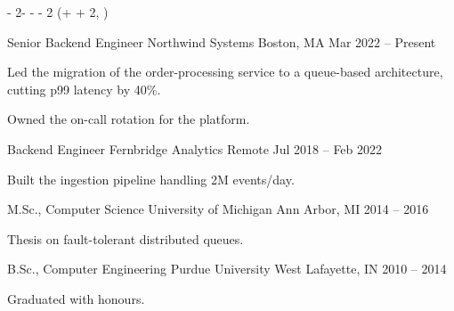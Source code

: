\documentclass[11pt, a4paper]{resume}
\begin{document}
\begin{textblock*}
    {\paperwidth - 2\sidemargin - \leftcolumnwidth - \columnsmargin - 2\timelinemargin}
    (\leftcolumnwidth + \columnsmargin + 2\timelinemargin, \headersmargin)
    \vspace{-2mm}

    \begin{cventries}
        \cventry
        {Senior Backend Engineer}
        {Northwind Systems}
        {Boston, MA}
        {Mar 2022 -- Present}
        {
        \begin{cvitems}
            \item {Led the migration of the order-processing service to a queue-based architecture, cutting p99 latency by 40\%.}
            \item {Owned the on-call rotation for the platform.}
        \end{cvitems}
        }
        \vspace{4mm}

        \cventry
        {Backend Engineer}
        {Fernbridge Analytics}
        {Remote}
        {Jul 2018 -- Feb 2022}
        {
        \begin{cvitems}
            \item {Built the ingestion pipeline handling 2M events/day.}
        \end{cvitems}
        }
    \end{cventries}

    \begin{cventries}
        \cventry
        {M.Sc., Computer Science}
        {University of Michigan}
        {Ann Arbor, MI}
        {2014 -- 2016}
        {
        \begin{cvitems}
            \item {Thesis on fault-tolerant distributed queues.}
        \end{cvitems}
        }
        \vspace{4mm}

        \cventry
        {B.Sc., Computer Engineering}
        {Purdue University}
        {West Lafayette, IN}
        {2010 -- 2014}
        {
        \begin{cvitems}
            \item {Graduated with honours.}
        \end{cvitems}
        }
    \end{cventries}
\end{textblock*}
\end{document}
